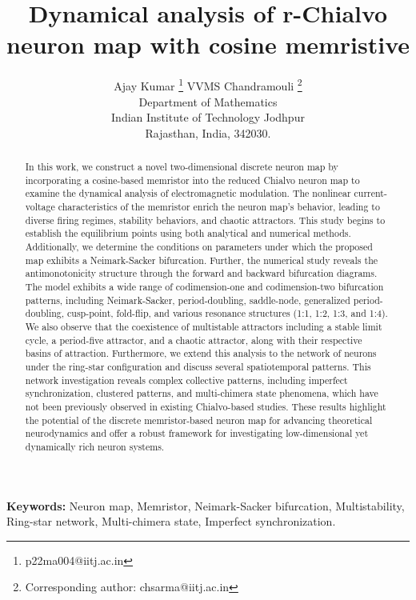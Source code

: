 \documentclass{article}
\title{Dynamical analysis of r-Chialvo neuron map with cosine memristive}
\author{
 Ajay Kumar \thanks{p22ma004@iitj.ac.in} \quad  VVMS Chandramouli \thanks{Corresponding author: chsarma@iitj.ac.in} \\
  Department of Mathematics\\
  Indian Institute of Technology Jodhpur\\
  Rajasthan, India, 342030. 
}
\begin{document}
\maketitle
\begin{abstract}
In this work, we construct a novel two-dimensional discrete neuron map by incorporating a cosine-based memristor into the reduced Chialvo neuron map to examine the dynamical analysis of electromagnetic modulation. The nonlinear current-voltage characteristics of the memristor enrich the neuron map's behavior, leading to diverse firing regimes, stability behaviors, and chaotic attractors. This study begins to establish the equilibrium points using both analytical and numerical methods. Additionally, we determine the conditions on parameters under which the proposed map exhibits a Neimark-Sacker bifurcation. Further, the numerical study reveals the antimonotonicity structure through the forward and backward bifurcation diagrams. The model exhibits a wide range of codimension-one and codimension-two bifurcation patterns, including Neimark-Sacker, period-doubling, saddle-node, generalized period-doubling, cusp-point, fold-flip, and various resonance structures (1:1, 1:2, 1:3, and 1:4). We also observe that the coexistence of multistable attractors including a stable limit cycle, a period-five attractor, and a chaotic attractor, along with their respective basins of attraction. Furthermore, we extend this analysis to the network of neurons under the ring-star configuration and discuss several spatiotemporal patterns. This network investigation reveals complex collective patterns, including imperfect synchronization, clustered patterns, and multi-chimera state phenomena, which have not been previously observed in existing Chialvo-based studies. These results highlight the potential of the discrete memristor-based neuron map for advancing theoretical neurodynamics and offer a robust framework for investigating low-dimensional yet dynamically rich neuron systems.
\end{abstract}

\noindent\textbf{Keywords:} Neuron map, Memristor, Neimark-Sacker bifurcation, Multistability, Ring-star network, Multi-chimera state, Imperfect synchronization.
\end{document}
